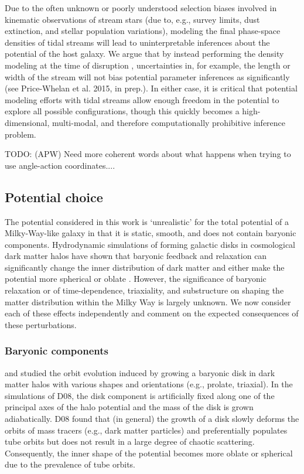 \documentclass[letterpaper,12pt,preprint]{aastex}
\newcommand{\todo}[2]{{\color{red} TODO: (\MakeUppercase{#1}) #2}}
\begin{document}
Due to the often unknown or poorly understood selection biases involved in kinematic observations of stream stars (due to, e.g., survey limits, dust extinction, and stellar population variations), modeling the final phase-space densities of tidal streams will lead to uninterpretable inferences about the potential of the host galaxy. We argue that by instead performing the density modeling at the time of disruption \citep[e.g.,][]{apw14}, uncertainties in, for example, the length or width of the stream will not bias potential parameter inferences as significantly (see Price-Whelan et al. 2015, in prep.). In either case, it is critical that potential modeling efforts with tidal streams allow enough freedom in the potential to explore all possible configurations, though this quickly becomes a high-dimensional, multi-modal, and therefore computationally prohibitive inference problem. 

\todo{apw}{Need more coherent words about what happens when trying to use angle-action coordinates...}.

\subsection{Potential choice}

The potential considered in this work is `unrealistic' for the total potential of a Milky-Way-like galaxy in that it is static, smooth, and does not contain baryonic components. Hydrodynamic simulations of forming galactic disks in cosmological dark matter halos have shown that baryonic feedback and relaxation can significantly change the inner distribution of dark matter and either make the potential more spherical or oblate \citep{many}. However, the significance of baryonic relaxation or of time-dependence, triaxiality, and substructure on shaping the matter distribution within the Milky Way is largely unknown. We now consider each of these effects independently and comment on the expected consequences of these perturbations.

\subsubsection{Baryonic components}

\cite[][D08]{debattista08} and \cite[][V10]{valluri10} studied the orbit evolution induced by growing a baryonic disk in dark matter halos with various shapes and orientations (e.g., prolate, triaxial). In the simulations of D08, the disk component is artificially fixed along one of the principal axes of the halo potential and the mass of the disk is grown adiabatically. D08 found that (in general) the growth of a disk slowly deforms the orbits of mass tracers (e.g., dark matter particles) and preferentially populates tube orbits but does not result in a large degree of chaotic scattering. Consequently, the inner shape of the potential becomes more oblate or spherical due to the prevalence of tube orbits. 
\end{document}
